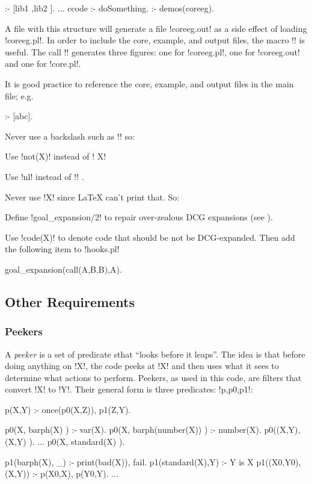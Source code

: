 \bl
:- [lib1 %
   ,lib2 %
   ].
...
ccode :- doSomething.
:- demos(coreeg). %
\el

A file with this structure will generate a file !coreeg.out! as a
side effect of loading !coreeg.pl!. In order to include the core,
example, and output files, the macro !! is useful. The
call !! generates three figures: one for !coreeg.pl!,
one for !coreeg.out! and one for !core.pl!.

It is good practice to reference the core, example, and output
files in the main file; e.g.

\bl
:-  [abc]. %
\el



Never use a backslash such as !\X! so: \bi \item Use !not(X)! instead
of !\+ X! \item Use !nl! instead of  !\n! . \ei

Never use !{X}! since {\LaTeX} can't print that. So: \bi \item Define
!goal_expansion/2! to repair over-zealous DCG expansions (see
). \item Use !code(X)! to denote code that should be
not be DCG-expanded. Then add the following item to !hooks.pl!

\begin{LISTING}
goal_expansion(call(A,B,B),A).
\end{LISTING}

\ei
\subsection{Other Requirements}

\subsubsection{Peekers}

A {\em peeker} is a set of predicate sthat  ``looks before it
leaps''. The idea is that before doing anything on !X!, the code
peeks at !X! and then uses what it sees to determine what actions to
perform. Peekers, as used in this code, are filters that convert !X!
to !Y!. Their general form is three predicates: !p,p0,p1!:

\begin{LISTING}
p(X,Y) :- once(p0(X,Z)), p1(Z,Y).

p0(X,          barph(X) ) :- var(X). %
p0(X,  barph(number(X)) ) :- number(X). %
p0((X,Y),         (X,Y) ). ...
p0(X,       standard(X) ). %

p1(barph(X),  _)   :- print(bad(X)), fail.
p1(standard(X),Y)  :- Y is X %
p1((X0,Y0), (X,Y)) :- p(X0,X), p(Y0,Y). ...
\end{LISTING}


